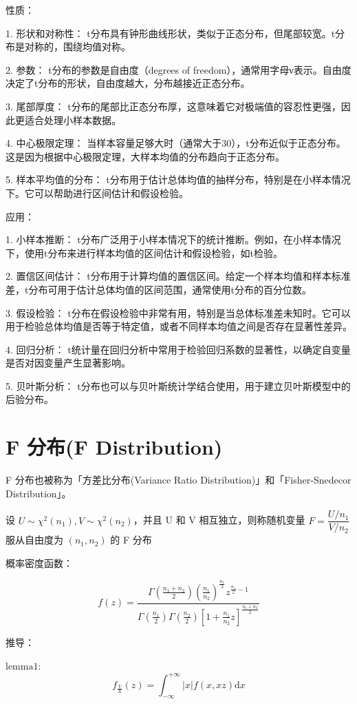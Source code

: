 \documentclass[12pt, a4paper, oneside]{ctexbook}
\begin{document}
 性质：
 
1. 形状和对称性： t分布具有钟形曲线形状，类似于正态分布，但尾部较宽。t分布是对称的，围绕均值对称。

2. 参数： t分布的参数是自由度（degrees of freedom），通常用字母ν表示。自由度决定了t分布的形状，自由度越大，分布越接近正态分布。

3. 尾部厚度： t分布的尾部比正态分布厚，这意味着它对极端值的容忍性更强，因此更适合处理小样本数据。

4. 中心极限定理： 当样本容量足够大时（通常大于30），t分布近似于正态分布。这是因为根据中心极限定理，大样本均值的分布趋向于正态分布。

5. 样本平均值的分布： t分布用于估计总体均值的抽样分布，特别是在小样本情况下。它可以帮助进行区间估计和假设检验。

 应用：

1. 小样本推断： t分布广泛用于小样本情况下的统计推断。例如，在小样本情况下，使用t分布来进行样本均值的区间估计和假设检验，如t检验。

2. 置信区间估计： t分布用于计算均值的置信区间。给定一个样本均值和样本标准差，t分布可用于估计总体均值的区间范围，通常使用t分布的百分位数。

3. 假设检验： t分布在假设检验中非常有用，特别是当总体标准差未知时。它可以用于检验总体均值是否等于特定值，或者不同样本均值之间是否存在显著性差异。

4. 回归分析： t统计量在回归分析中常用于检验回归系数的显著性，以确定自变量是否对因变量产生显著影响。

5. 贝叶斯分析： t分布也可以与贝叶斯统计学结合使用，用于建立贝叶斯模型中的后验分布。

\section{F 分布(F Distribution)}

F 分布也被称为「方差比分布(Variance Ratio Distribution)」和「Fisher-Snedecor Distribution」。

设 $U \sim \chi^{2}(n_1), V \sim \chi^{2}(n_2)$，并且 U 和 V 相互独立，则称随机变量 $F = \dfrac{U / n_1}{V / n_2}$ 服从自由度为 $(n_1, n_2)$ 的 F 分布

 概率密度函数：

$$
f(z) = \dfrac{\Gamma(\frac{n_1 + n_2}{2})(\frac{n_1}{n_2})^{\frac{n_1}{2}}z^{\frac{n_1}{2} - 1}}{\Gamma(\frac{n_1}{2})\Gamma(\frac{n_2}{2})\left[1 + \frac{n_1}{n_2}z\right]^{\frac{n_1 + n_2}{2}}}
$$

 推导：

$\text{lemma1}:$
$$
f_{\frac{Y}{X}}(z) = \int_{-\infty}^{+\infty}|x|f(x, xz)\mathrm{d}x
$$
\end{document}
